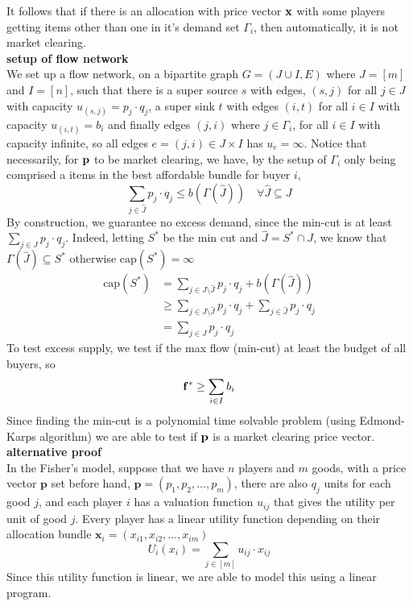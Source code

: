\documentclass[12pt]{article}
\newcommand \bld[1]{\boldsymbol{#1}}
\begin{document}
\begin{itemize}
		 	It follows that if there is an allocation with price vector $\bold{x}$ with some players getting items other than one in it's demand set $\Gamma_{i}$, then automatically, it is not market clearing. 
		 	\\
		 	\textbf{setup of flow network}
		 	\\
		 	We set up a flow network, on a bipartite graph $G = (J \cup I, E)$ where $J = [m]$ and $I = [n]$, such that there is a super source $s$ with edges, $(s, j)$ for all $j \in J$ with capacity $u_{(s,j)} = p_j \cdot q_j$,  a super sink $t$ with edges $(i,t)$ for all $i \in I$ with capacity $u_{(i,t)} = b_i$ and finally edges $(j,i)$ where $j \in \Gamma_i$, for all $i \in I$ with capacity infinite, so all edges $e = (j,i) \in J\times I$ has $u_{e} = \infty$. Notice that necessarily, for $\bold{p}$ to be market clearing, we have, by the setup of $\Gamma_i$ only being comprised a items in the best affordable bundle for buyer $i$, 
		 	\[
		 		\sum_{j \in \hat{J}} p_j \cdot q_j \leq b(\Gamma(\hat{J})) \quad \forall \hat{J} \subseteq J
		 	\]
		 	By construction, we guarantee no excess demand, since the min-cut is at least $\displaystyle \sum_{j \in J} p_j \cdot q_j$. Indeed, letting $S^*$ be the min cut and $\hat{J} = S^* \cap J$, we know that $\Gamma(\hat{J}) \subseteq S^*$ otherwise $\text{cap}(S^*) = \infty$
		 	\begin{align*}
		 		\text{cap}(S^*) &= \sum_{j \in J\setminus \hat{J}} p_j \cdot q_j + b(\Gamma(\hat{J}))\\
		 									&\geq \sum_{j \in J\setminus \hat{J}} p_j \cdot q_j +\sum_{j \in \hat{J}} p_j \cdot q_j  \\
		 									&= \sum_{j \in J} p_j \cdot q_j
		 	\end{align*}
		 	To test excess supply, we test if the max flow  (min-cut) at least the budget of all buyers, so 
		 	\[\bold{f^*} \geq \sum_{i \in I} b_i\]
		 	Since finding the min-cut is a polynomial time solvable problem (using Edmond-Karps algorithm) we are able to test if $\bold{p}$ is a market clearing price vector. 
		 	\\
	\textbf{alternative proof}
	\\
	In the Fisher's model, suppose that we have $n$ players and $m$ goods, with a price vector $\bld{p}$ set before hand, $\bld{p} = (p_1,p_2,\ldots,p_m)$, there are also $q_j$ units for each good $j$, and each player $i$ has a valuation function $u_{ij}$ that gives the utility per unit of good $j$. Every player has a linear utility function depending on their allocation bundle $\bld{x}_i = (x_{i1},x_{i2},\ldots,x_{im})$
	\[
	U_i(x_i) = \sum_{j \in [m]} u_{ij}\cdot x_{ij}
	\]
	Since this utility function is linear, we are able to model this using a linear program.




\end{itemize}
\end{document}

